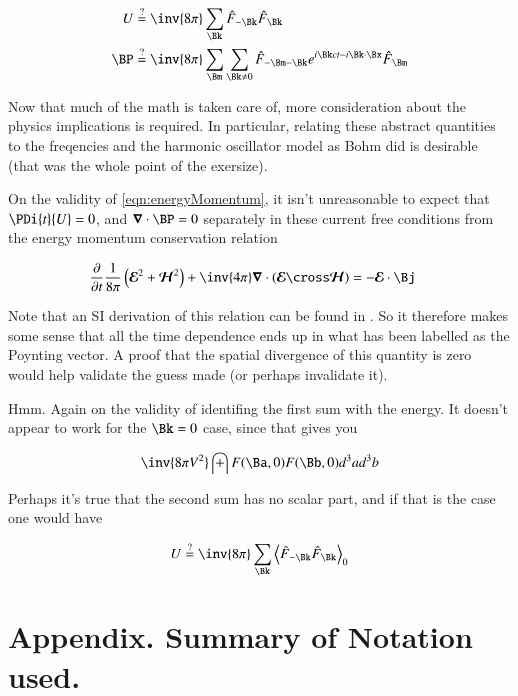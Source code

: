 \documentclass{article}
\newcommand{\EE}[0]{\boldsymbol{\mathcal{E}}}
\newcommand{\HH}[0]{\boldsymbol{\mathcal{H}}}
\begin{document}
\begin{align}\label{eqn:energyMomentum}
U & 
\stackrel{?}{=}
 \inv{8 \pi} \sum_{\Bk} \hat{F}_{-\Bk} \hat{F}_{\Bk} \\
\BP &
\stackrel{?}{=}
 \inv{8 \pi} \sum_{\Bm} \sum_{\Bk \ne 0} \hat{F}_{-\Bm -\Bk} e^{ i \Bk ct -i \Bk \cdot \Bx } \hat{F}_{\Bm}
\end{align}

Now that much of the math is taken care of, more consideration about the physics implications is required.  In particular, relating these
abstract quantities to the freqencies and the harmonic oscillator model as Bohm did is desirable (that was the whole point of the exersize).

On the validity of \ref{eqn:energyMomentum}, it isn't unreasonable to expect that 
$\PDi{t}{U} = 0$, and $\spacegrad \cdot \BP = 0$ separately in these current free conditions from the energy momentum conservation relation

\begin{align}
\PD{t}{}\frac{1}{8\pi} \left(\EE^2 + \HH^2\right) + \inv{4\pi} \spacegrad \cdot (\EE \cross \HH) &= -\EE \cdot \Bj 
\end{align}

Note that an SI derivation of this relation can be found in \cite{PJpoynting}.  So it therefore makes some sense that all the time dependence ends
up in what has been labelled as the Poynting vector.  A proof that the spatial divergence of this quantity is zero would help validate
the guess made (or perhaps invalidate it).

Hmm.  Again on the validity of identifing the first sum with the energy.  It doesn't appear to work for the $\Bk = 0$ case, since that gives you

\begin{align*}
\inv{8 \pi V^2} \int F(\Ba, 0) F(\Bb, 0) d^3 a d^3b
\end{align*}

Perhaps it's true that the second sum has no scalar part, and if that is the case one would have

\begin{align*}
U
\stackrel{?}{=}
 \inv{8 \pi} \sum_{\Bk} \gpgradezero{\hat{F}_{-\Bk} \hat{F}_{\Bk}} \\
\end{align*}

\section{ Appendix.  Summary of Notation used. }
\end{document}

